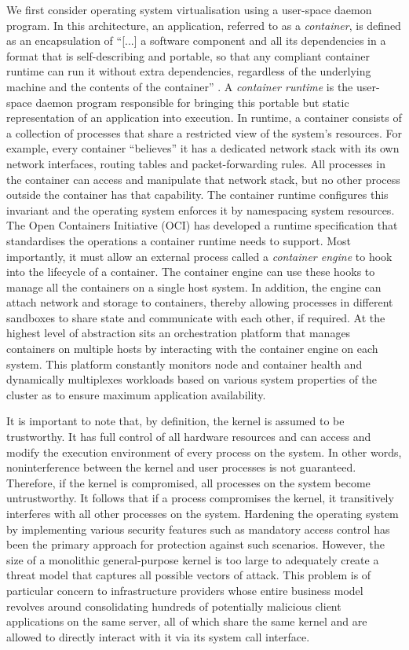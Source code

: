 We first consider operating system virtualisation using a user-space daemon program.
In this architecture, an application, referred to as a \textit{container},
is defined as an encapsulation of \enquote{[...] a software component and all its dependencies 
in a format that is self-describing and portable, so that any compliant container runtime can run it without extra 
dependencies, regardless of the underlying machine and the contents of the container} \cite[1]{oci-runtime-principles}.
A \textit{container runtime} is the user-space daemon program responsible for bringing this portable but 
static representation of an application into execution. In runtime, a container consists of a collection of processes 
that share a restricted view of the system's resources. For example, every container \enquote{believes}
it has a dedicated network stack with its own network interfaces, routing tables and packet-forwarding rules.
All processes in the container can access and manipulate that network stack, but no other process 
outside the container has that capability.
The container runtime configures this invariant and the operating system enforces it by 
namespacing system resources. The Open Containers Initiative (OCI) \cite{oci-website} has 
developed a runtime specification that standardises the operations a container runtime
needs to support. Most importantly, it must allow an external process called a \textit{container engine}
to hook into the lifecycle of a container. The container engine can use these hooks to manage 
all the containers on a single host system. In addition, the engine can attach network and storage 
to containers, thereby allowing processes in different sandboxes to share state and communicate 
with each other, if required. At the highest level of abstraction sits an orchestration platform that 
manages containers on multiple hosts by interacting with the container engine on each system.
This platform constantly monitors node and container health and dynamically multiplexes workloads 
based on various system properties of the cluster as to ensure maximum application availability.

It is important to note that, by definition, the kernel is assumed to be trustworthy. 
It has full control of all hardware resources and can access and modify the execution environment of every process on the system. 
In other words, noninterference between the kernel and user processes is not guaranteed.
Therefore, if the kernel is compromised, all processes on the system become untrustworthy.
It follows that if a process compromises the kernel, it transitively interferes with all other 
processes on the system. Hardening the operating system by implementing various security features such as
mandatory access control has been the primary approach for protection against such scenarios. 
However, the size of a monolithic general-purpose kernel is too large to adequately 
create a threat model that captures all possible vectors of attack. This problem is of particular concern 
to infrastructure providers whose entire business model revolves around consolidating hundreds of potentially 
malicious client applications on the same server, all of which share the same kernel and are allowed to directly interact with 
it via its system call interface. 

